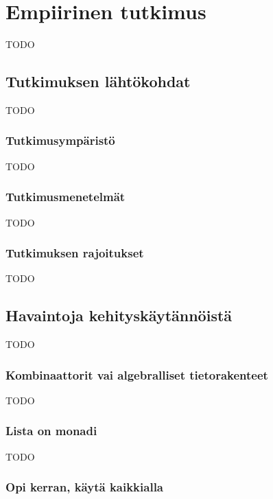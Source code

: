 \vspace{21.5pt}
\chapter{Empiirinen tutkimus}

TODO

\section{Tutkimuksen lähtökohdat}

TODO

\subsection{Tutkimusympäristö}

TODO

\subsection{Tutkimusmenetelmät}

TODO

\subsection{Tutkimuksen rajoitukset}


TODO
\section{Havaintoja kehityskäytännöistä}

TODO

\subsection{Kombinaattorit vai algebralliset tietorakenteet}

TODO

\subsection{Lista on monadi}

TODO

\subsection{Opi kerran, käytä kaikkialla}

